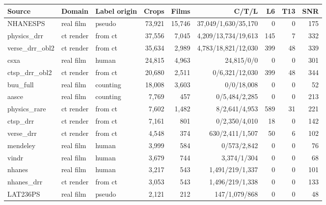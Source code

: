 \begin{tabular}{lllrrrrrr}
\toprule
Source & Domain & Label origin & Crops & Films & C/T/L & L6 & T13 & SNR \\
\midrule
NHANESPS & real film & pseudo & 73,921 & 15,746 & 37,049/1,630/35,170 & 0 & 0 & 175 \\
physics\_drr & ct render & from ct & 37,556 & 7,045 & 4,209/13,734/19,613 & 145 & 7 & 332 \\
verse\_drr\_obl2 & ct render & from ct & 35,634 & 2,989 & 4,783/18,821/12,030 & 399 & 48 & 339 \\
csxa & real film & human & 24,815 & 4,963 & 24,815/0/0 & 0 & 0 & 301 \\
ctsp\_drr\_obl2 & ct render & from ct & 20,680 & 2,511 & 0/6,321/12,030 & 399 & 48 & 344 \\
buu\_full & real film & counting & 18,008 & 3,603 & 0/0/18,008 & 0 & 0 & 52 \\
aasce & real film & counting & 7,769 & 457 & 0/5,484/2,285 & 0 & 0 & 213 \\
physics\_rare & ct render & from ct & 7,602 & 1,482 & 8/2,641/4,953 & 589 & 31 & 221 \\
ctsp\_drr & ct render & from ct & 7,161 & 801 & 0/2,350/4,010 & 18 & 0 & 142 \\
verse\_drr & ct render & from ct & 4,548 & 374 & 630/2,411/1,507 & 50 & 6 & 102 \\
mendeley & real film & human & 3,999 & 584 & 0/573/2,842 & 0 & 0 & 76 \\
vindr & real film & human & 3,679 & 744 & 3,374/1/304 & 0 & 0 & 68 \\
nhanes & real film & human & 3,217 & 543 & 1,491/219/1,337 & 0 & 0 & 101 \\
nhanes\_drr & ct render & from ct & 3,053 & 543 & 1,496/219/1,338 & 0 & 0 & 133 \\
LAT236PS & real film & pseudo & 2,121 & 212 & 147/1,079/868 & 0 & 0 & 48 \\
\bottomrule
\end{tabular}
